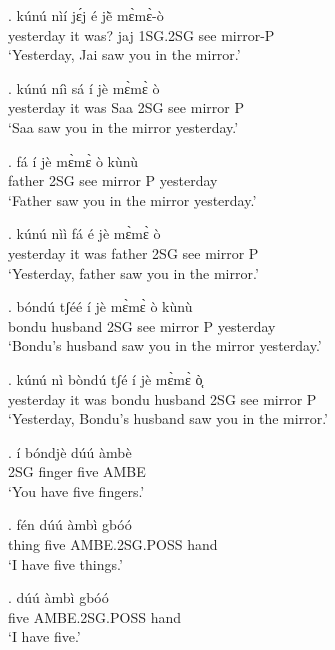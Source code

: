 \documentclass{assets/fieldnotes}
\begin{document}
\exg. kúnú nìí jɛ́j é jẽ̀ mɛ̀mɛ̀-ò \\
yesterday {it was?} jaj 1SG.2SG see mirror-P \\
`Yesterday, Jai saw you in the mirror.'


\exg. kúnú níì sá í jè mɛ̀mɛ̀ ò \\
yesterday {it was} Saa 2SG see mirror P \\
`Saa saw you in the mirror yesterday.'

\exg. fá í jè mɛ̀mɛ̀ ò kùnù \\
father 2SG see mirror P yesterday \\
`Father saw you in the mirror yesterday.'

\exg. kúnú nìì fá é jè mɛ̀mɛ̀ ò \\
yesterday {it was} father 2SG see mirror P \\
`Yesterday, father saw you in the mirror.'

\exg. bóndú tʃéé í jè mɛ̀mɛ̀ ò kùnù \\ %
bondu husband 2SG see mirror P yesterday \\
`Bondu's husband saw you in the mirror yesterday.'

\exg. kúnú nì bòndú tʃé í jè mɛ̀mɛ̀ ò̜̜ \\
yesterday {it was} bondu husband 2SG see mirror P \\
`Yesterday, Bondu's husband saw you in the mirror.'

\exg. í bóndjè dúú àmbè \\
2SG finger five AMBE \\
`You have five fingers.'

\exg. fén dúú àmbì gbóó \\
thing five AMBE.2SG.POSS hand \\
`I have five things.' 


\exg. dúú àmbì gbóó \\
five AMBE.2SG.POSS hand \\
`I have five.'


 
\end{document}

